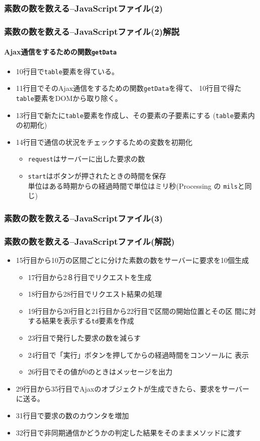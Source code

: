 \begin{frame}[containsverbatim]
 \frametitle{素数の数を数える--JavaScriptファイル(2)}
 \frametitle{素数の数を数える--JavaScriptファイル(2)解説}
 \framesubtitle{Ajax通信をするための関数\texttt{getData}}
\begin{itemize}
 \item 10行目で\texttt{table}要素を得ている。
 \item 11行目でそのAjax通信をするための関数\texttt{getData}を得て、
       10行目で得た\texttt{table}要素をDOMから取り除く。
 \item 13行目で新たに\texttt{table}要素を作成し、その要素の子要素にする
       (\texttt{table}要素内の初期化)
 \item 14行目で通信の状況をチェックするための変数を初期化
       \begin{itemize}
        \item \texttt{request}はサーバーに出した要求の数
        \item \texttt{start}はボタンが押されたときの時間を保存\\
              単位はある時期からの経過時間で単位はミリ秒(Processing の
              \texttt{mils}と同じ)
       \end{itemize}
\end{itemize}
\end{frame}
\begin{frame}[containsverbatim]
 \frametitle{素数の数を数える--JavaScriptファイル(3)}
\end{frame}
\begin{frame}[containsverbatim]
 \frametitle{素数の数を数える--JavaScriptファイル(解説)}
 \begin{itemize}
\item 15行目から10万の区間ごとに分けた素数の数をサーバーに要求を10個生成
 \begin{itemize}
  \item 17行目から2８行目でリクエストを生成
  \item 18行目から28行目でリクエスト結果の処理
  \item 19行目から20行目と21行目から22行目で区間の開始位置とその区
        間に対する結果を表示する\texttt{td}要素を作成
  \item 23行目で発行した要求の数を減らす
  \item 24行目で「実行」ボタンを押してからの経過時間をコンソールに
        表示
  \item 26行目でその値が$0$のときはメッセージを出力
 \end{itemize}
  \item 29行目から35行目でAjaxのオブジェクトが生成できたら、要求をサーバー
        に送る。
  \item 31行目で要求の数のカウンタを増加
  \item 32行目で非同期通信かどうかの判定した結果をそのままメソッドに渡す
 \end{itemize}
\end{frame}
